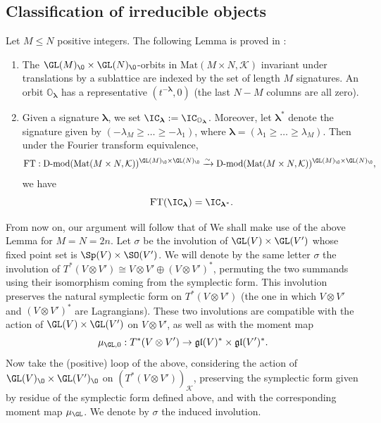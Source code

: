 \documentclass[11pt]{article}
\begin{document}
\subsection{Classification of irreducible objects}
Let $M \leq N$ positive integers.
The following Lemma is proved in \cite[Lemmas 3.2.1, 3.2.2]{BFKT}:
\begin{lemma} \label{lemma: GL orbits}
    \begin{enumerate}
        \item The $\GL(M)_\O\times\GL(N)_\O$-orbits in $\mathrm{Mat}(M\times N, \mathcal{K})$ invariant under translations by a sublattice are indexed by the set of length $M$ signatures. An orbit $\mathbb{O}_{\boldsymbol{\lambda}}$ has a representative $(t^{-{\boldsymbol{\lambda}}}, 0)$ (the last $N-M$ columns are all zero).
        \item Given a signature ${\boldsymbol{\lambda}}$, we set $\IC_{\boldsymbol{\lambda}}:=\IC_{\mathbb{O}_{\boldsymbol{\lambda}}}$. Moreover, let $\boldsymbol{\lambda}^*$ denote the signature given by $(-\lambda_M\geq \dots\geq -\lambda_1)$, where $\boldsymbol{\lambda}=(\lambda_1\geq\dots\geq\lambda_M)$. Then under the Fourier transform equivalence, $$\mathrm{FT}:\operatorname{D-mod}(\mathrm{Mat}(M\times N, \mathcal{K}))^{\GL(M)_\O\times \GL(N)_\O}\xrightarrow{\sim} \operatorname{D-mod}(\mathrm{Mat}(M\times N, \mathcal{K}))^{\GL(M)_\O\times \GL(N)_\O},$$ we have $$\mathrm{FT}(\IC_{\boldsymbol{\lambda}}) = \IC_{\boldsymbol{\lambda}^*}.$$
    \end{enumerate}
\end{lemma}

From now on, our argument will follow that of \cite[§2.6]{BFT2}
We shall make use of the above Lemma for $M=N=2n$. Let $\sigma$ be the involution of $\GL(V)\times \GL(V')$ whose fixed point set is $\Sp(V)\times \SO(V')$. We will denote by the same letter $\sigma$ the involution of $T^*(V\otimes V')\cong V\otimes V' \oplus (V\otimes V')^*$, permuting the two summands using their isomorphism coming from the symplectic form. This involution preserves the natural symplectic form on $T^*(V\otimes V')$ (the one in which $V\otimes V'$ and $(V\otimes V')^*$ are Lagrangians).
These two involutions are compatible with the action of $\GL(V)\times \GL(V')$ on $V\otimes V'$, as well as with the moment map $$\mu_{\GL,0}: T^*(V\otimes V')\to \mathfrak{gl}(V)^* \times \mathfrak{gl}(V')^*.$$
Now take the (positive) loop of the above, considering the action of $\GL(V)_\O\times \GL(V')_\O$ on $(T^*(V\otimes V'))_{\mathcal{K}}$, preserving the symplectic form given by residue of the symplectic form defined above, and with the corresponding moment map $\mu_{\GL}$. We denote by $\sigma$ the induced involution.
\end{document}
